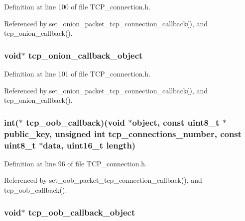 Definition at line 100 of file T\+C\+P\+\_\+connection.\+h.



Referenced by set\+\_\+onion\+\_\+packet\+\_\+tcp\+\_\+connection\+\_\+callback(), and tcp\+\_\+onion\+\_\+callback().

\hypertarget{struct_t_c_p___connections_a16e85b0c2c930afee6a25f7229c7116e}{
\subsubsection[{tcp\+\_\+onion\+\_\+callback\+\_\+object}]{\setlength{\rightskip}{0pt plus 5cm}void$\ast$ tcp\+\_\+onion\+\_\+callback\+\_\+object}}\label{struct_t_c_p___connections_a16e85b0c2c930afee6a25f7229c7116e}


Definition at line 101 of file T\+C\+P\+\_\+connection.\+h.



Referenced by set\+\_\+onion\+\_\+packet\+\_\+tcp\+\_\+connection\+\_\+callback(), and tcp\+\_\+onion\+\_\+callback().

\hypertarget{struct_t_c_p___connections_a758941f7bcf27ba64ae59503bef4ee06}{
\subsubsection[{tcp\+\_\+oob\+\_\+callback}]{\setlength{\rightskip}{0pt plus 5cm}int($\ast$ tcp\+\_\+oob\+\_\+callback)(void $\ast$object, const uint8\+\_\+t $\ast$public\+\_\+key, unsigned int tcp\+\_\+connections\+\_\+number, const uint8\+\_\+t $\ast$data, uint16\+\_\+t length)}}\label{struct_t_c_p___connections_a758941f7bcf27ba64ae59503bef4ee06}


Definition at line 96 of file T\+C\+P\+\_\+connection.\+h.



Referenced by set\+\_\+oob\+\_\+packet\+\_\+tcp\+\_\+connection\+\_\+callback(), and tcp\+\_\+oob\+\_\+callback().

\hypertarget{struct_t_c_p___connections_aa008021141b9c1d9861a06d12b495f55}{
\subsubsection[{tcp\+\_\+oob\+\_\+callback\+\_\+object}]{\setlength{\rightskip}{0pt plus 5cm}void$\ast$ tcp\+\_\+oob\+\_\+callback\+\_\+object}}\label{struct_t_c_p___connections_aa008021141b9c1d9861a06d12b495f55}


